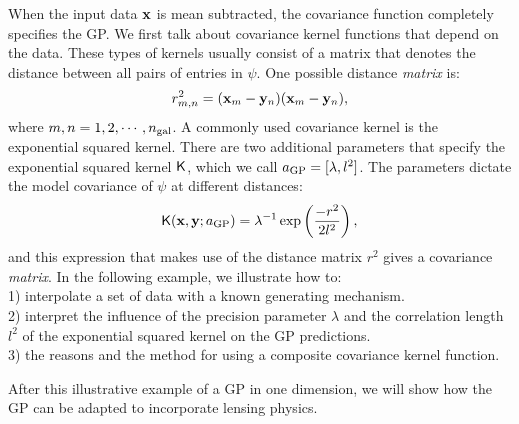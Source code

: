 When the input data $\mathbf{x}$ is mean subtracted, the covariance function  
completely specifies the GP. 
We first talk about covariance kernel functions that depend on the data. These types of kernels 
usually consist of a matrix that denotes the distance between all pairs of entries
in $\psi$. 
One possible distance {\it matrix} is: 
\begin{equation}
	r_{m, n}^2 = (\mathbf{x}_m - \mathbf{y}_n)(\mathbf{x}_m - \mathbf{y}_n),
\end{equation}
where $m, n = 1, 2, \cdots, n_{\rm gal}$.
A commonly used covariance kernel is the exponential squared kernel. There are two
additional parameters that specify the exponential squared kernel $\mathsf{K}$, 
which we call $a_{\rm GP} = [\lambda, l^2]$. The parameters dictate the model 
covariance of $\psi$ at different distances: 
\begin{equation}
	\mathsf{K}(\mathbf{x}, \mathbf{y};a_{\rm GP}) = \lambda^{-1} \exp\left(\frac{-r^2}{2 l^2}\right),
	\label{eqn:exp_sq_kernel}
\end{equation}
and this expression that makes use of the distance matrix $r^2$ gives a covariance {\it matrix}. 
In the following example, we illustrate how to: \\
1) interpolate a set of data with a known generating mechanism.
\\
2) interpret the influence of the precision parameter $\lambda$ and the correlation
length $l^2$ of the exponential squared kernel on the GP predictions. \\
3) the reasons and the method for using a composite covariance kernel function.

After this illustrative example of a GP in one dimension, we will show how the
GP can be adapted to incorporate lensing physics.


